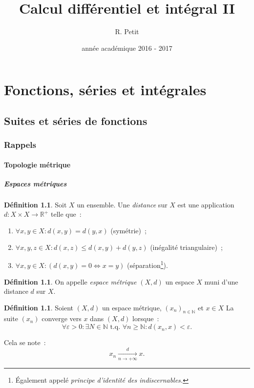 \documentclass{report}
\title{Calcul différentiel et intégral II}
\author{R. Petit}
\date{année académique 2016 - 2017}
\theoremstyle{definition}
\newtheorem{déf}[thm]{Définition}
\theoremstyle{remark}
\numberwithin{equation}{section}
\newcommand{\R}{\mathbb R}
\newcommand{\Rp}{\R^{+}}
\newcommand{\N}{\mathbb N}
\newcommand{\tq}{\text{ t.q. }}
\newcommand{\seq}[3]{\left(#1_{#2}\right)_{#2 \in #3}}
\newcommand{\mconv}[3]{\xrightarrow[#1 \to #2]{#3}}
\newcommand{\pinfty}{{+\infty}}
\begin{document}
\maketitle
\tableofcontents
\newpage
\setcounter{page}{1}

\part{Fonctions, séries et intégrales}
\chapter{Suites et séries de fonctions}
	\section{Rappels}
		\subsection{Topologie métrique}
			\subsubsection{Espaces métriques}
				\begin{déf} Soit $X$ un ensemble. Une \textit{distance} sur $X$ est une application $d : X \times X \to \Rp$ telle que~:

				\begin{enumerate}
					\item $\forall x, y \in X : d(x, y) = d(y, x)$ (symétrie)~;
					\item $\forall x, y, z \in X : d(x, z) \leq d(x, y) + d(y, z)$ (inégalité triangulaire)~;
					\item $\forall x, y \in X : \left(d(x, y) = 0 \iff x = y\right)$ (séparation\footnote{Également appelé
						  \textit{principe d'identité des indiscernables.}}).
				\end{enumerate}
				\end{déf}

				\begin{déf}  On appelle \textit{espace métrique} $(X, d)$ un espace $X$ muni d'une distance $d$ sur $X$. \end{déf}

				\begin{déf} Soient $(X, d)$ un espace métrique, $\seq xn\N$ et $x \in X$ La suite $(x_n)$ converge vers $x$ dans $(X, d)$ lorsque~:
				\begin{equation}
					\forall \varepsilon > 0 : \exists N \in \N \tq \forall n \geq \N : d(x_n, x) < \varepsilon.
				\end{equation}

				Cela se note~:
				\begin{equation}
					x_n \mconv n\pinfty d x.
				\end{equation}
				\end{déf}
\end{document}
